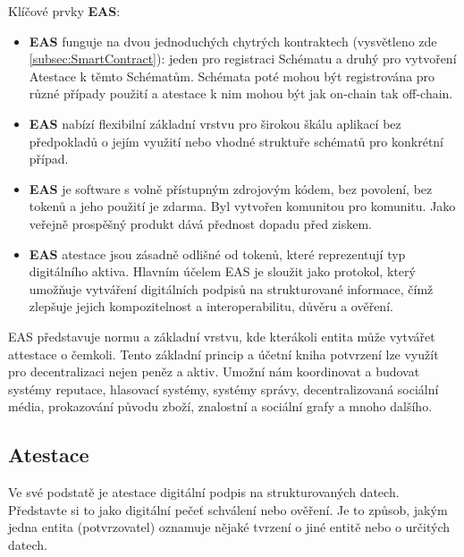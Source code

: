 Klíčové prvky \textbf{EAS}:

\begin{itemize}
	
	\item \textbf{EAS} funguje na dvou jednoduchých chytrých kontraktech (vysvětleno zde \ref{subsec:SmartContract}): jeden pro registraci Schématu a druhý pro vytvoření Atestace k těmto Schématům. Schémata poté mohou být registrována pro různé případy použití a atestace k nim mohou být jak on-chain tak off-chain.
	
	\item \textbf{EAS} nabízí flexibilní základní vrstvu pro širokou škálu aplikací bez předpokladů o jejím využití nebo vhodné struktuře schématů pro konkrétní případ.
	
	\item \textbf{EAS} je software s volně přístupným zdrojovým kódem, bez povolení, bez tokenů a jeho použití je zdarma. Byl vytvořen komunitou pro komunitu. Jako veřejně prospěšný produkt dává přednost dopadu před ziskem.
	
	\item \textbf{EAS} atestace jsou zásadně odlišné od tokenů, které reprezentují typ digitálního aktiva. Hlavním účelem EAS je sloužit jako protokol, který umožňuje vytváření digitálních podpisů na strukturované informace, čímž zlepšuje jejich kompozitelnost a interoperabilitu, důvěru a ověření.
	
\end{itemize}

EAS představuje normu a základní vrstvu, kde kterákoli entita může vytvářet attestace o čemkoli. Tento základní princip a účetní kniha potvrzení lze využít pro decentralizaci nejen peněz a aktiv. Umožní nám koordinovat a budovat systémy reputace, hlasovací systémy, systémy správy, decentralizovaná sociální média, prokazování původu zboží, znalostní a sociální grafy a mnoho dalšího. 	\cite{EAS:Intro}






\subsection{Atestace}\label{subsec:Attestation}



Ve své podstatě je atestace digitální podpis na strukturovaných datech. Představte si to jako digitální pečeť schválení nebo ověření. Je to způsob, jakým jedna entita (potvrzovatel) oznamuje nějaké tvrzení o jiné entitě nebo o určitých datech.

